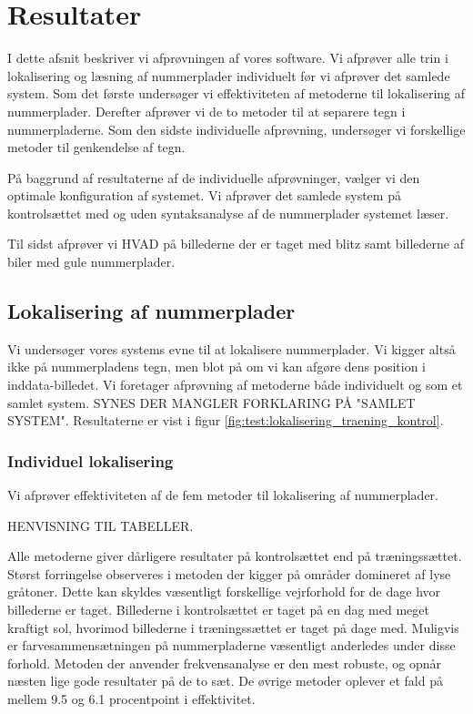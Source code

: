 \section{Resultater}
\label{sec:resultater}
I dette afsnit beskriver vi afprøvningen af vores software. Vi afprøver alle trin i lokalisering og læsning af nummerplader individuelt før vi afprøver det samlede system. Som det første undersøger vi effektiviteten af metoderne til lokalisering af nummerplader. Derefter afprøver vi de to metoder til at separere tegn i nummerpladerne. Som den sidste individuelle afprøvning, undersøger vi forskellige metoder til genkendelse af tegn.

På baggrund af resultaterne af de individuelle afprøvninger, vælger vi den optimale konfiguration af systemet. Vi afprøver det samlede system på kontrolsættet med og uden syntaksanalyse af de nummerplader systemet læser.  

Til sidst afprøver vi HVAD på billederne der er taget med blitz samt billederne af biler med gule nummerplader.


\subsection{Lokalisering af nummerplader}
Vi undersøger vores systems evne til at lokalisere nummerplader. Vi kigger altså ikke på nummerpladens tegn, men blot på om vi kan afgøre dens position i inddata-billedet. Vi foretager afprøvning af metoderne både individuelt og som et samlet system. SYNES DER MANGLER FORKLARING PÅ "SAMLET SYSTEM". Resultaterne er vist i figur \vref{fig:test:lokalisering_traening_kontrol}.

\subsubsection{Individuel lokalisering}
Vi afprøver effektiviteten af de fem metoder til lokalisering af nummerplader.

HENVISNING TIL TABELLER.

Alle metoderne giver dårligere resultater på kontrolsættet end på træningssættet. Størst forringelse observeres i metoden der kigger på områder domineret af lyse gråtoner. Dette kan skyldes væsentligt forskellige vejrforhold for de dage hvor billederne er taget. Billederne i kontrolsættet er taget på en dag med meget kraftigt sol, hvorimod billederne i træningssættet er taget på dage med. Muligvis er farvesammensætningen på nummerpladerne væsentligt anderledes under disse forhold.  Metoden der anvender frekvensanalyse er den mest robuste, og opnår næsten lige gode resultater på de to sæt. De øvrige metoder oplever et fald på mellem 9.5 og 6.1 procentpoint i effektivitet.

